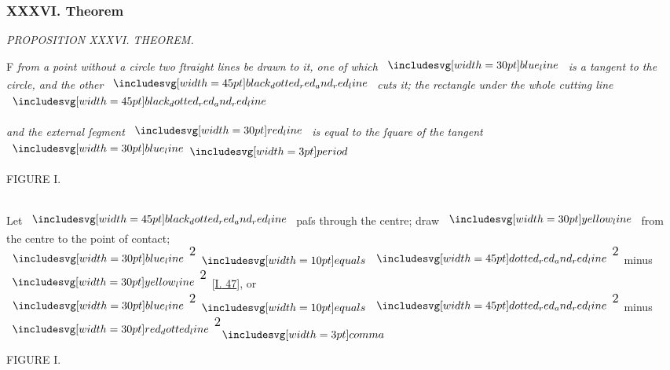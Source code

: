 \documentclass[11pt,preview]{standalone}
\begin{document}
\subsubsection{XXXVI. Theorem}

\hfill

\begin{minipage}[t]{\textwidth}
    \begin{center}
        \textit{PROPOSITION XXXVI. THEOREM.}\label{book3pr36} \\
    \end{center}

    \hfill

    \begin{center}
        \raggedright \lettrine[lines=3, loversize=1, nindent=0pt]{}{}F \textit{from a point without a circle two ſtraight lines be drawn to it, one of which } $\blueline$ \textit{is a tangent to the circle, and the other} $\bimg{black_dotted_red_and_red_line}$ \textit{cuts it; the rectangle under the whole cutting line} $\bimg{black_dotted_red_and_red_line}$
    \end{center}
    \raggedright \textit{and the external ſegment} $\redline$ \textit{is equal to the ſquare of the tangent} $\blueline \bperiod$
\end{minipage}%

\hfill

\begin{minipage}[t]{0.54\textwidth}
    \vspace{0pt}

    \begin{center}
        FIGURE I.\\
        \hfill\\
        \raggedright Let $\bimg{black_dotted_red_and_red_line}$ paſs through the centre; draw $\yellowline$ from the centre to the point of contact;
        $\blueline^{\text{\large 2}} \bequals \bimg{dotted_red_and_red_line}^{\text{\large 2}}$ minus $\yellowline^{\text{\large 2}}$ [\hyperref[book1pr47]{\textsc{I.} 47}], or $\blueline^{\text{\large 2}} \bequals \bimg{dotted_red_and_red_line}^{\text{\large 2}}$ minus $\dottedredline^{\text{\large 2}} \bcomma$
    \end{center}
\end{minipage}%
\hfill
\begin{minipage}[t]{0.43\textwidth}
    \vspace{0pt}
    \begin{center}
        FIGURE I.
    \end{center}
    \hfill\\
    
\end{minipage}%
\end{document}
